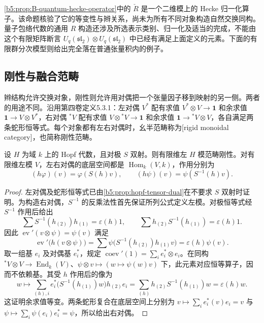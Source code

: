 \ProseParagraphBreak
\cref{b5:prop:B-quantum-hecke-operator}中的 \(\check R\) 是一个二维模上的 Hecke 归一化算子。该命题核验了它的等变性与辫关系，尚未为所有不同对象构造自然交换同构。量子包络代数的通用 \(R\) 构造还涉及所选表示类别、归一化及适当的完成，不能由这个有限矩阵断言 \(U_q(\mathfrak{sl}_2)\otimes U_q(\mathfrak{sl}_2)\) 中已经有满足上面定义的元素。下面的有限群分次模型则给出完全落在普通张量积内的例子。

\subsection{刚性与融合范畴}
\label{b5:subsec:B05:02}

辫结构允许交换对象，刚性则允许用对偶把一个张量因子移到映射的另一侧。两者的用途不同。沿用第四卷定义5.3.1：左对偶 \(V^*\) 配有求值 \(V^*\otimes V\to\mathbf1\) 和余求值 \(\mathbf1\to V\otimes V^*\)，右对偶 \({}^*V\) 配有求值 \(V\otimes{}^*V\to\mathbf1\) 和余求值 \(\mathbf1\to{}^*V\otimes V\)，各自满足两条蛇形恒等式。每个对象都有左右对偶时，幺半范畴称为[rigid monoidal category]，也简称刚性范畴。

\begin{proposition}\label{b5:prop:B-hopf-rigid}
	设 \(H\) 为域 \(k\) 上的 Hopf 代数，且对极 \(S\) 双射。则有限维左 \(H\) 模范畴刚性。对有限维左模 \(V\)，左右对偶的底层空间都是 \(\operatorname{Hom}_k(V,k)\)，作用分别为
	\[
		(h\varphi)(v)=\varphi(S(h)v),\qquad
		(h\psi)(v)=\psi(S^{-1}(h)v).
	\]
\end{proposition}
\begin{proof}
	左对偶及蛇形恒等式已由\cref{b5:prop:hopf-tensor-dual}在不要求 \(S\) 双射时证明。为构造右对偶，\(S^{-1}\) 的反乘法性首先保证所列公式定义左模。对极恒等式经 \(S^{-1}\) 作用后给出
	\[
		\sum S^{-1}(h_{(2)})h_{(1)}=\varepsilon(h)1,
		\qquad
		\sum h_{(2)}S^{-1}(h_{(1)})=\varepsilon(h)1.
	\]
	因此 \(\operatorname{ev}'(v\otimes\psi)=\psi(v)\) 满足
	\[
		\operatorname{ev}'\bigl(h(v\otimes\psi)\bigr)
		=\sum\psi\bigl(S^{-1}(h_{(2)})h_{(1)}v\bigr)
		=\varepsilon(h)\psi(v).
	\]
	取一组基 \(e_i\) 及对偶基 \(e_i^*\)，规定 \(\operatorname{coev}'(1)=\sum_i e_i^*\otimes e_i\)。在同构 \({}^*V\otimes V\to\operatorname{End}_k(V)\)、\(\psi\otimes v\mapsto(w\mapsto\psi(w)v)\) 下，此元素对应恒等算子，因而不依赖基。其受 \(h\) 作用后的像为
	\[
		w\longmapsto\sum_{(h),i}e_i^*\bigl(S^{-1}(h_{(1)})w\bigr)h_{(2)}e_i
		=\sum_{(h)}h_{(2)}S^{-1}(h_{(1)})w
		=\varepsilon(h)w.
	\]
	这证明余求值等变。两条蛇形复合在底层空间上分别为 \(v\mapsto\sum_i e_i^*(v)e_i=v\) 与 \(\psi\mapsto\sum_i\psi(e_i)e_i^*=\psi\)，所以给出右对偶。
\end{proof}

